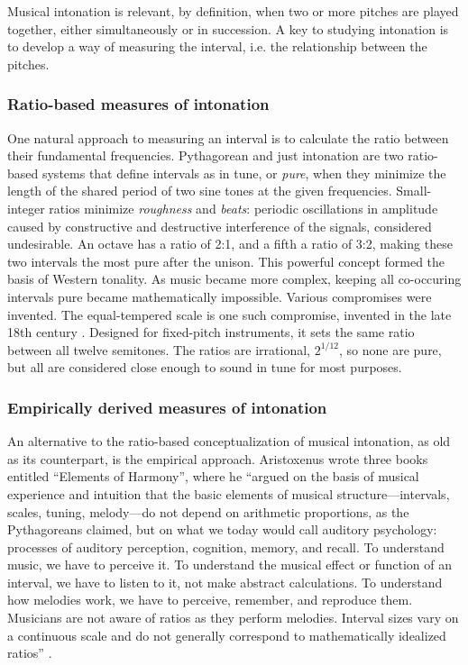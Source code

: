 Musical intonation is relevant, by definition, when two or more pitches are played together, either simultaneously or in succession. A key to studying intonation is to develop a way of measuring the interval, i.e. the relationship between the pitches. 

\subsubsection{Ratio-based measures of intonation}
\label{sec:ratio}
One natural approach to measuring an interval is to calculate the ratio between their fundamental frequencies. Pythagorean and just intonation are two ratio-based systems that define intervals as in tune, or \textit{pure}, when they minimize the length of the shared period of two sine tones at the given frequencies. Small-integer ratios minimize \textit{roughness} and \textit{beats}: periodic oscillations in amplitude caused by constructive and destructive interference of the signals, considered undesirable. An octave has a ratio of 2:1, and a fifth a ratio of 3:2, making these two intervals the most pure after the unison. This powerful concept formed the basis of Western tonality. As music became more complex, keeping all co-occuring intervals pure became mathematically impossible. Various compromises were invented. The equal-tempered scale is one such compromise, invented in the late 18th century \cite{equaltemperament}. Designed for fixed-pitch instruments, it sets the same ratio between all twelve semitones. The ratios are irrational, $2^{1/12}$, so none are pure, but all are considered close enough to sound in tune for most purposes. 

\subsubsection{Empirically derived measures of intonation}
\label{sec:empirical}
An alternative to the ratio-based conceptualization of musical intonation, as old as its counterpart, is the empirical approach. Aristoxenus wrote three books entitled ``Elements of Harmony'', where he ``argued on the basis of musical experience and intuition that the basic elements of musical structure---intervals, scales, tuning, melody---do not depend on arithmetic  proportions, as the Pythagoreans claimed, but on what we today would call auditory psychology: processes of auditory perception, cognition, memory, and recall. To understand music, we have to perceive it. To understand the musical effect or function of an interval, we have to listen to it, not make abstract calculations. To understand how melodies work, we have to perceive, remember, and reproduce them. Musicians are not aware of ratios as they perform melodies. Interval sizes vary on a continuous scale and do not generally correspond to mathematically idealized ratios'' \cite{parncutt2018psychocultural}. 

